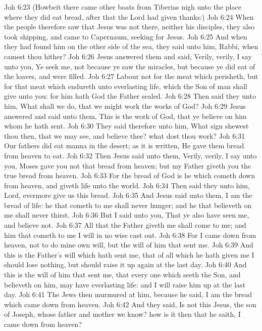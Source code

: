 \vs Joh 6:23 (Howbeit there came other boats from Tiberias nigh unto the place where they did eat bread, after that the Lord had given thanks:)
\vs Joh 6:24 When the people therefore saw that Jesus was not there, neither his disciples, they also took shipping, and came to Capernaum, seeking for Jesus.
\vs Joh 6:25 And when they had found him on the other side of the sea, they said unto him, Rabbi, when camest thou hither?
\vs Joh 6:26 Jesus answered them and said, Verily, verily, I say unto you, Ye seek me, not because ye saw the miracles, but because ye did eat of the loaves, and were filled.
\vs Joh 6:27 Labour not for the meat which perisheth, but for that meat which endureth unto everlasting life, which the Son of man shall give unto you: for him hath God the Father sealed.
\vs Joh 6:28 Then said they unto him, What shall we do, that we might work the works of God?
\vs Joh 6:29 Jesus answered and said unto them, This is the work of God, that ye believe on him whom he hath sent.
\vs Joh 6:30 They said therefore unto him, What sign shewest thou then, that we may see, and believe thee? what dost thou work?
\vs Joh 6:31 Our fathers did eat manna in the desert; as it is written, He gave them bread from heaven to eat.
\vs Joh 6:32 Then Jesus said unto them, Verily, verily, I say unto you, Moses gave you not that bread from heaven; but my Father giveth you the true bread from heaven.
\vs Joh 6:33 For the bread of God is he which cometh down from heaven, and giveth life unto the world.
\vs Joh 6:34 Then said they unto him, Lord, evermore give us this bread.
\vs Joh 6:35 And Jesus said unto them, I am the bread of life: he that cometh to me shall never hunger; and he that believeth on me shall never thirst.
\vs Joh 6:36 But I said unto you, That ye also have seen me, and believe not.
\vs Joh 6:37 All that the Father giveth me shall come to me; and him that cometh to me I will in no wise cast out.
\vs Joh 6:38 For I came down from heaven, not to do mine own will, but the will of him that sent me.
\vs Joh 6:39 And this is the Father's will which hath sent me, that of all which he hath given me I should lose nothing, but should raise it up again at the last day.
\vs Joh 6:40 And this is the will of him that sent me, that every one which seeth the Son, and believeth on him, may have everlasting life: and I will raise him up at the last day.
\vs Joh 6:41 The Jews then murmured at him, because he said, I am the bread which came down from heaven.
\vs Joh 6:42 And they said, Is not this Jesus, the son of Joseph, whose father and mother we know? how is it then that he saith, I came down from heaven?
